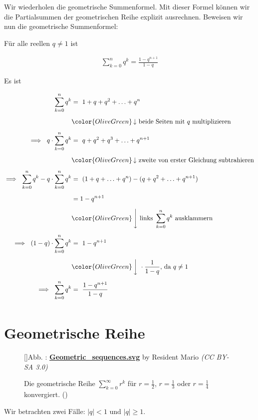 \documentclass[fontsize=9pt,
               parskip=half-,
               DIV=14,
               listof=chapterentry,
               tocflat]{scrbook}
\newcounter{imagelabel}
\begin{document}
Wir wiederholen die geometrische Summenformel. Mit dieser Formel können wir die Partialsummen der geometrischen Reihe explizit ausrechnen.  Beweisen wir nun die geometrische Summenformel:

\begin{theorem*}
Für alle reellen $q\neq 1$ ist

\begin{align*}
\sum _{k=0}^{n}q^{k}={\frac {1-q^{n+1}}{1-q}}
\end{align*}

\end{theorem*}

\begin{proof*}
Es ist

\begin{align*}
\sum _{k=0}^{n}q^{k}&=\ 1+q+q^{2}+\ldots +q^{n}\\[0.5em]&{\color {OliveGreen}\left\downarrow \ {\text{beide Seiten mit }}q{\text{ multiplizieren}}\right.}\\[0.5em]\implies \ q\cdot \sum _{k=0}^{n}q^{k}&=\ q+q^{2}+q^{3}+\ldots +q^{n+1}\\[0.5em]&{\color {OliveGreen}\left\downarrow \ {\text{zweite von erster Gleichung subtrahieren}}\right.}\\[0.5em]\implies \ \sum _{k=0}^{n}q^{k}-q\cdot \sum _{k=0}^{n}q^{k}&=\ (1+q+\ldots +q^{n})-(q+q^{2}+\ldots +q^{n+1})\\[0.5em]&=1-q^{n+1}\\[0.5em]&{\color {OliveGreen}\left\downarrow \ {\text{links }}\sum _{k=0}^{n}q^{k}{\text{ ausklammern}}\right.}\\[0.5em]\implies \ (1-q)\cdot \sum _{k=0}^{n}q^{k}&=\ 1-q^{n+1}\\[0.5em]&{\color {OliveGreen}\left\downarrow \ {}\cdot {\frac {1}{1-q}}{\text{, da }}q\neq 1\right.}\\[0.5em]\implies \ \sum _{k=0}^{n}q^{k}&=\ {\frac {1-q^{n+1}}{1-q}}\\[0.5em]
\end{align*}

\end{proof*}

\section{Geometrische Reihe}

\begin{figure}[h]
\vspace{\baselineskip}
[]{Abb. : \protect\href{https://commons.wikimedia.org/wiki/File:Geometric_sequences.svg}{\textbf{Geometric\allowbreak\_sequences.svg}} by Resident Mario \textit{(CC BY-SA 3.0)}}\centering
{}
\caption*{Die geometrische Reihe $\sum _{k=0}^{\infty }r^{k}$ für $r={\tfrac {1}{2}}$, $r={\tfrac {1}{3}}$ oder $r={\tfrac {1}{4}}$ konvergiert. ()}
\end{figure}
Wir betrachten zwei Fälle: $|q|<1{\text{ und }}|q|\geq 1$.
\end{document}
